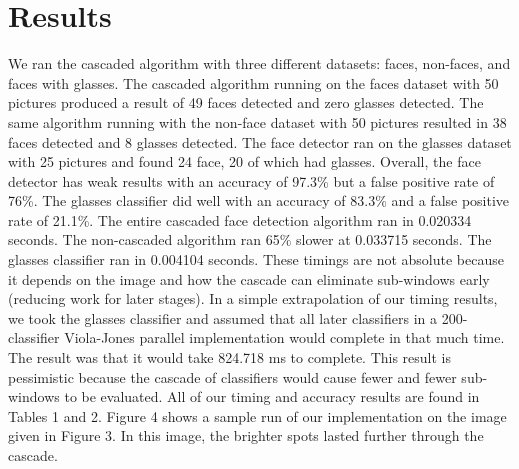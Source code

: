 \documentclass[12pt] {article}
\begin{document}
\section{Results}
We ran the cascaded algorithm with three different datasets: faces, non-faces, and faces with glasses. The cascaded algorithm running on the faces dataset with 50 pictures produced a result of 49 faces detected and zero glasses detected. The same algorithm running with the non-face dataset with 50 pictures resulted in 38 faces detected and 8 glasses detected. The face detector ran on the glasses dataset with 25 pictures and found 24 face, 20 of which had glasses. Overall, the face detector has weak results with an accuracy of 97.3\% but a false positive rate of 76\%. The glasses classifier did well with an accuracy of 83.3\% and a false positive rate of 21.1\%. The entire cascaded face detection algorithm ran in 0.020334 seconds. The non-cascaded algorithm ran 65\% slower at 0.033715 seconds. The glasses classifier ran in 0.004104 seconds. These timings are not absolute because it depends on the image and how the cascade can eliminate sub-windows early (reducing work for later stages). In a simple extrapolation of our timing results, we took the glasses classifier and assumed that all later classifiers in a 200-classifier Viola-Jones parallel implementation would complete in that much time. The result was that it would take 824.718 ms to complete. This result is pessimistic because the cascade of classifiers would cause fewer and fewer sub-windows to be evaluated. All of our timing and accuracy results are found in Tables 1 and 2. Figure 4 shows a sample run of our implementation on the image given in Figure 3. In this image, the brighter spots lasted further through the cascade.
\end{document}
